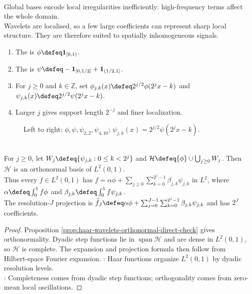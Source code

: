 \begin{perspective} \label{per:why-wavelets-after-orthogonal-series} \\
Global bases encode local irregularities inefficiently: high-frequency terms affect the whole domain.\\
Wavelets are localised, so a few large coefficients can represent sharp local structure. They are therefore suited to spatially inhomogeneous signals.
\end{perspective}

\begin{definition} \label{def:haar-father-mother-wavelets} 
\begin{enumerate}[label=(\roman*)]
\setlength{\itemsep}{0pt}
\item The  is $\phi\defeq\mathbf{1}_{[0,1)}$.
\item The  is $\psi\defeq-\mathbf{1}_{[0,1/2]}+\mathbf{1}_{(1/2,1]}$.
\item For $j\geq0$ and $k\in\mathbb{Z}$, set $\phi_{j,k}(x)\defeq2^{j/2}\phi(2^jx-k)$ and $\psi_{j,k}(x)\defeq2^{j/2}\psi(2^jx-k)$.
\item Larger $j$ gives support length $2^{-j}$ and finer localization.
\end{enumerate}
\end{definition}

\begin{figure}[H]
  \centering
  
  \caption{Left to right: $\phi,\psi,\psi_{2,2},\psi_{4,10}$; $\psi_{j,k}(x)=2^{j/2}\psi(2^jx-k)$.}
  \label{fig:haar-wavelet-examples}
\end{figure}

\begin{theorem} \label{thm:haar-wavelet-basis-expansion} \\
For $j\geq0$, let $W_j\defeq\{\psi_{j,k}:0\leq k<2^j\}$ and $\mathcal{H}\defeq\{\phi\}\cup\bigcup_{j\geq0}W_j$. Then $\mathcal{H}$ is an orthonormal basis of $L^2(0,1)$.\\
Thus every $f\in L^2(0,1)$ has $f=\alpha\phi+\sum_{j\geq0}\sum_{k=0}^{2^j-1}\beta_{j,k}\psi_{j,k}$ in $L^2$, where $\alpha\defeq\int_0^1f\phi$ and $\beta_{j,k}\defeq\int_0^1f\psi_{j,k}$.\\
The resolution-$J$ projection is $\widetilde f_J\defeq\alpha\phi+\sum_{j=0}^{J-1}\sum_{k=0}^{2^j-1}\beta_{j,k}\psi_{j,k}$ and has $2^J$ coefficients.
\begin{proof}
Proposition \ref{prop:haar-wavelets-orthonormal-direct-check} gives orthonormality.
Dyadic step functions lie in $\operatorname{span}\mathcal{H}$ and are dense in $L^2(0,1)$, so $\mathcal{H}$ is complete.
The expansion and projection formula then follow from Hilbert-space Fourier expansion.
: Haar functions organize $L^2(0,1)$ by dyadic resolution levels.\\
: Completeness comes from dyadic step functions; orthogonality comes from zero-mean local oscillations.
\end{proof}
\end{theorem}

